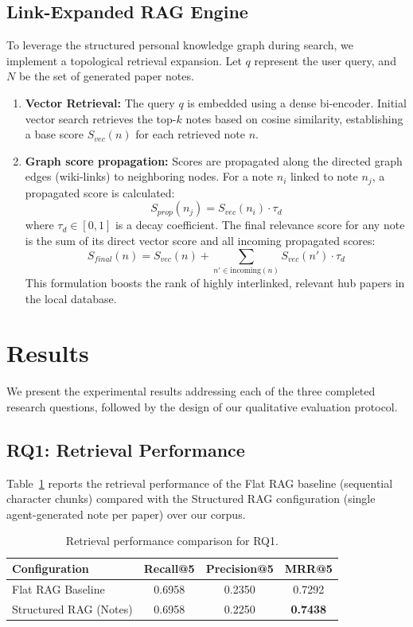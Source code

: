 \documentclass[runningheads]{llncs}
\begin{document}
\subsection{Link-Expanded RAG Engine}
To leverage the structured personal knowledge graph during search, we implement a topological retrieval expansion. Let $q$ represent the user query, and $N$ be the set of generated paper notes.
\begin{enumerate}
    \item \textbf{Vector Retrieval:} The query $q$ is embedded using a dense bi-encoder. Initial vector search retrieves the top-$k$ notes based on cosine similarity, establishing a base score $S_{vec}(n)$ for each retrieved note $n$.
    \item \textbf{Graph score propagation:} Scores are propagated along the directed graph edges (wiki-links) to neighboring nodes. For a note $n_i$ linked to note $n_j$, a propagated score is calculated:
    \[
    S_{prop}(n_j) = S_{vec}(n_i) \cdot \tau_d
    \]
    where $\tau_d \in [0, 1]$ is a decay coefficient. The final relevance score for any note is the sum of its direct vector score and all incoming propagated scores:
    \[
    S_{final}(n) = S_{vec}(n) + \sum_{n' \in \text{incoming}(n)} S_{vec}(n') \cdot \tau_d
    \]
    This formulation boosts the rank of highly interlinked, relevant hub papers in the local database.
\end{enumerate}

\section{Results}
\label{sec:results}

We present the experimental results addressing each of the three completed research questions, followed by the design of our qualitative evaluation protocol.

\subsection{RQ1: Retrieval Performance}
Table~\ref{tab:rq1_results} reports the retrieval performance of the Flat RAG baseline (sequential character chunks) compared with the Structured RAG configuration (single agent-generated note per paper) over our corpus.

\begin{table}[h]
\centering
\caption{Retrieval performance comparison for RQ1.}
\label{tab:rq1_results}
\begin{tabular}{lccc}
\toprule
\textbf{Configuration} & \textbf{Recall@5} & \textbf{Precision@5} & \textbf{MRR@5} \\
\midrule
Flat RAG Baseline & 0.6958 & 0.2350 & 0.7292 \\
Structured RAG (Notes) & 0.6958 & 0.2250 & \textbf{0.7438} \\
\bottomrule
\end{tabular}
\end{table}
\end{document}
